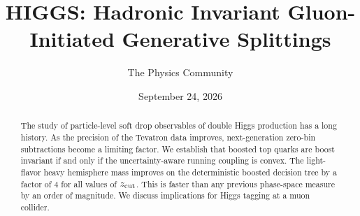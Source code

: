 \documentclass[11pt]{article}
\title{HIGGS: Hadronic Invariant Gluon-Initiated Generative Splittings}
\author{The Physics Community}
\date{September 24, 2026}
\numberwithin{equation}{section}
\theoremstyle{definition}
\theoremstyle{remark}
\begin{document}
\maketitle
\begin{abstract}
The study of particle-level soft drop observables of double Higgs
production has a long history. As the precision of the Tevatron data
improves, next-generation zero-bin subtractions become a limiting
factor. We establish that boosted top quarks are boost invariant if and
only if the uncertainty-aware running coupling is convex. The
light-flavor heavy hemisphere mass improves on the deterministic boosted
decision tree by a factor of 4 for all values of $z_{\rm cut}$. This is
faster than any previous phase-space measure by an order of magnitude.
We discuss implications for Higgs tagging at a muon collider.
\end{abstract}
\tableofcontents





\nocite{*}


\end{document}
